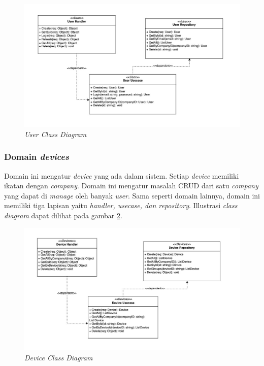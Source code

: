 \begin{figure}[ht]
  \centering
  \includegraphics[width=1\textwidth]{resources/chapter-3/class/user-class-diagram.jpg}
  \caption{\textit{User Class Diagram}}
  \label{fig:user-class-diagram}
\end{figure}

\subsubsection{Domain \textit{devices}}

Domain ini mengatur \textit{device} yang ada dalam sistem. Setiap \textit{device} memiliki ikatan dengan \textit{company}. Domain ini mengatur masalah CRUD dari satu \textit{company} yang dapat di \textit{manage} oleh banyak \textit{user}. Sama seperti domain lainnya, domain ini memiliki tiga lapisan yaitu \textit{handler, usecase, dan repository}. Illustrasi \textit{class diagram} dapat dilihat pada gambar \ref{fig:device-class-diagram}.

\begin{figure}[ht]
  \centering
  \includegraphics[width=1\textwidth]{resources/chapter-3/class/device-class-diagram.jpg}
  \caption{\textit{Device Class Diagram}}
  \label{fig:device-class-diagram}
\end{figure}

